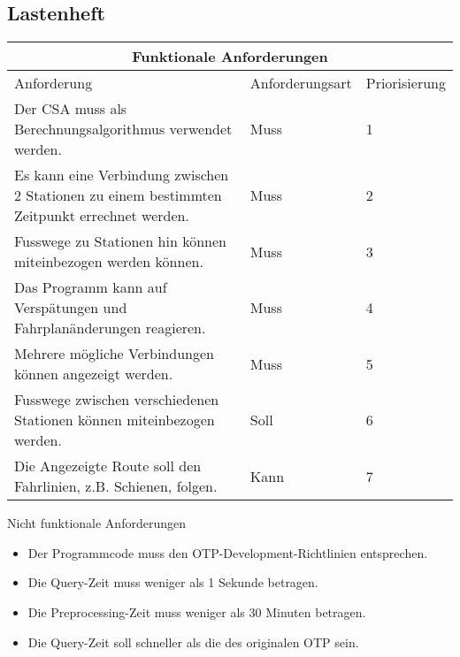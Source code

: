 \subsection{Lastenheft}
\label{Lastenheft}
\begin{tabular}{ | p{5cm} | l | l | }
	\hline
	\multicolumn{3}{|c|}{Funktionale Anforderungen} \\
	\hline
	Anforderung & Anforderungsart & Priorisierung \\
	\hline
	Der CSA muss als Berechnungsalgorithmus verwendet werden. & Muss & 1 \\
	\hline
	Es kann eine Verbindung zwischen 2 Stationen zu einem bestimmten Zeitpunkt errechnet werden. & Muss & 2 \\
	\hline
	Fusswege zu Stationen hin können miteinbezogen werden können. & Muss & 3 \\
	\hline
	Das Programm kann auf Verspätungen und Fahrplanänderungen reagieren. & Muss & 4 \\
	\hline
	Mehrere mögliche Verbindungen können angezeigt werden. & Muss & 5 \\
	\hline
	Fusswege zwischen verschiedenen Stationen können miteinbezogen werden. & Soll & 6 \\
	\hline
	Die Angezeigte Route soll den Fahrlinien, z.B. Schienen, folgen. & Kann & 7 \\
	\hline
\end{tabular}
\newline
\newline
\newline
Nicht funktionale Anforderungen
\begin{itemize}
	\item Der Programmcode muss den OTP-Development-Richtlinien entsprechen.
	\item Die Query-Zeit muss weniger als 1 Sekunde betragen.
	\item Die Preprocessing-Zeit muss weniger als 30 Minuten betragen.
	\item Die Query-Zeit soll schneller als die des originalen OTP sein.
\end{itemize}